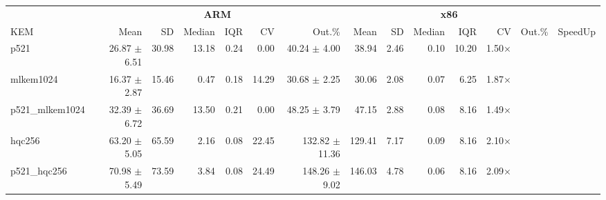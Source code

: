 \begin{table}[!ht]
\centering
\begin{tabular}{l|rrrrrr|rrrrrr|r}
\toprule
& \multicolumn{6}{c}{\bfseries ARM} & \multicolumn{6}{c}{\bfseries x86} & \\
\cmidrule(lr){2-7} \cmidrule(lr){8-13}
KEM & Mean & SD & Median & IQR & CV & Out.\% & Mean & SD & Median & IQR & CV & Out.\% & SpeedUp \\
\midrule
p521 			& 26.87 $\pm$ 6.51 & 30.98 & 13.18 & 0.24 & 0.00 & 40.24  $\pm$ 4.00 & 38.94 & 2.46 & 0.10 & 10.20 & 1.50× \\
mlkem1024 		& 16.37 $\pm$ 2.87 & 15.46 & 0.47 & 0.18 & 14.29 & 30.68  $\pm$ 2.25 & 30.06 & 2.08 & 0.07 & 6.25 & 1.87× \\
p521\_mlkem1024  & 32.39 $\pm$ 6.72 & 36.69 & 13.50 & 0.21 & 0.00 & 48.25  $\pm$ 3.79 & 47.15 & 2.88 & 0.08 & 8.16 & 1.49× \\
hqc256 			& 63.20 $\pm$ 5.05 & 65.59 & 2.16 & 0.08 & 22.45 & 132.82 $\pm$ 11.36 & 129.41 & 7.17 & 0.09 & 8.16 & 2.10× \\
p521\_hqc256 	& 70.98 $\pm$ 5.49 & 73.59 & 3.84 & 0.08 & 24.49 & 148.26 $\pm$ 9.02 & 146.03 & 4.78 & 0.06 & 8.16 & 2.09× \\
\bottomrule
\end{tabular}
\end{table}
